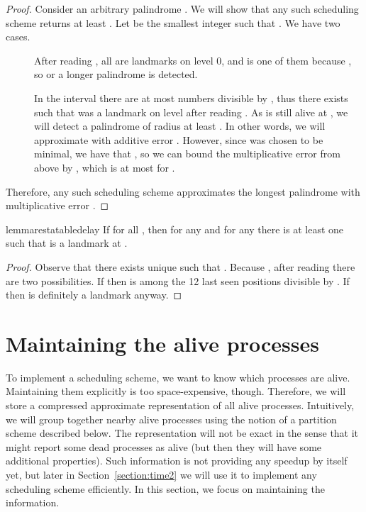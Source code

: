 \documentclass{article}[11pt,letter]
\begin{document}
\begin{proof}
Consider an arbitrary palindrome . We will show that any such scheduling scheme returns at least .
Let  be the smallest integer such that . We have two cases.

\begin{description}
\item[] After reading , all  are landmarks on level 0, and  is one
of them because , so  or a longer palindrome is detected.

\item[] In the interval  there are at most   numbers divisible by ,
thus there exists  such that  was a landmark on level  after reading . As  is still alive
at , we will detect a palindrome of radius at least . In other words, we will approximate  with additive error .
However, since  was chosen to be minimal, we have that , so we can bound the multiplicative error from above by
, which is at most  for .
\end{description}
Therefore, any such scheduling scheme approximates the longest palindrome with multiplicative error .
\end{proof}

\begin{restatable}{lemma}{restatabledelay}
\label{lemma:delay}
If  for all , then for any  and for any  there is at least one  such that 
 is a landmark at .
\end{restatable}

\begin{proof}
Observe that there exists unique  such that . Because , after reading  there are two possibilities. If  then  is among the 12 last seen positions divisible by . If  then  is definitely a landmark anyway.
\end{proof}

\section{Maintaining the alive processes}
\label{section:time}

To implement a scheduling scheme, we want to know which processes are alive. Maintaining
them explicitly is too space-expensive, though.
Therefore, we will store a compressed approximate representation of all alive processes.
Intuitively, we will group together nearby alive processes using the notion
of a partition scheme described below. The representation will not be exact
in the sense that it might report some dead processes as alive (but then they will
have some additional properties).
Such information is not providing any speedup by itself yet,
but later in Section~\ref{section:time2} we will use it to implement any scheduling scheme efficiently.
In this section, we focus on maintaining the information.
\end{document}
